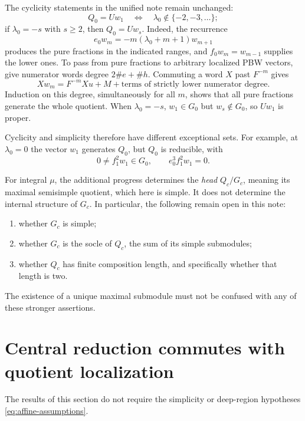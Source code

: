 \documentclass[11pt,a4paper]{article}
\theoremstyle{plainupright}
\begin{document}
The cyclicity statements in the unified note remain unchanged:
\[
Q_0=Uw_1\quad\Longleftrightarrow\quad
\lambda_0\notin\{-2,-3,\ldots\};
\]
if \(\lambda_0=-s\) with \(s\ge2\), then \(Q_0=Uw_s\).
Indeed, the recurrence
\[
e_0w_m=-m(\lambda_0+m+1)w_{m+1}
\]
produces the pure fractions in the indicated ranges, and
\(f_0w_m=w_{m-1}\) supplies the lower ones.
To pass from pure fractions to arbitrary localized PBW vectors,
give numerator words degree \(2\#e+\#h\).
Commuting a word \(X\) past \(F^{-m}\) gives
\[
Xw_m=F^{-m}Xu+M+
\text{terms of strictly lower numerator degree}.
\]
Induction on this degree, simultaneously for all \(m\), shows that
all pure fractions generate the whole quotient.
When \(\lambda_0=-s\), \(w_1\in G_0\) but \(w_s\notin G_0\), so
\(Uw_1\) is proper.

Cyclicity and simplicity therefore have different exceptional sets.
For example, at \(\lambda_0=0\) the vector \(w_1\) generates \(Q_0\),
but \(Q_0\) is reducible, with
\[
0\ne f_1^2w_1\in G_0,\qquad e_0^3f_1^2w_1=0.
\]

For integral \(\mu\), the additional progress determines the
\emph{head} \(Q_c/G_c\), meaning its maximal semisimple quotient,
which here is simple. It does not determine the internal structure
of \(G_c\). In particular, the following remain open in this note:
\begin{enumerate}[label=\textup{(\roman*)}]
\item whether \(G_c\) is simple;
\item whether \(G_c\) is the socle of \(Q_c\), the sum of its simple
submodules;
\item whether \(Q_c\) has finite composition length, and specifically
whether that length is two.
\end{enumerate}
The existence of a unique maximal submodule must not be confused
with any of these stronger assertions.

\section{Central reduction commutes with quotient localization}

The results of this section do not require the simplicity or deep-region
hypotheses \eqref{eq:affine-assumptions}.
\end{document}
